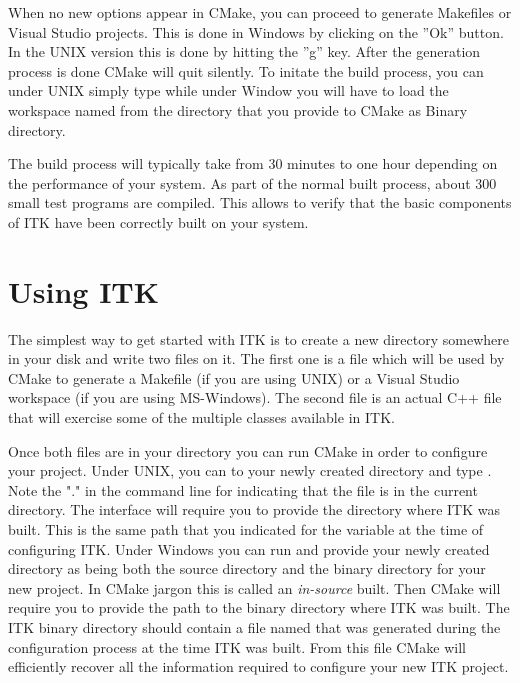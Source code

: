 When no new options appear in CMake, you can proceed to generate Makefiles or
Visual Studio projects. This is done in Windows by clicking on the ''Ok''
button.  In the UNIX version this is done by hitting the ''g'' key. After the
generation process is done CMake will quit silently. To initate the build
process, you can under UNIX simply type  while under Window you will
have to load the workspace named  from the directory that you
provide to CMake as Binary directory.

The build process will typically take from 30 minutes to one hour depending on
the performance of your system. As part of the normal built process, about 300
small test programs are compiled. This allows to verify that the basic
components of ITK have been correctly built on your system.


\section{Using ITK }
\label{sec:UsingITK}
 
The simplest way to get started with  ITK is to create a new directory
somewhere in your disk and write two files on it. The first one is a
 file which will be used by CMake to generate a Makefile
(if you are using UNIX) or a Visual Studio workspace (if you are using
MS-Windows).  The second file is an actual C++ file that will exercise some of
the multiple classes available in ITK.

Once both files are in your directory you can run CMake in order to configure
your project. Under UNIX, you can  to your newly created directory and
type . Note the "." in the command line for indicating that
the  file is in the current directory. The 
interface will require you to provide the directory where ITK was built. This
is the same path that you indicated for the  variable at
the time of configuring ITK. Under Windows you can run  and
provide your newly created directory as being both the source directory and the
binary directory for your new project. In CMake jargon this is called an
\emph{in-source} built. Then CMake will require you to provide the path to the
binary directory where ITK was built. The ITK binary directory should contain a
file named  that was generated during the configuration
process at the time ITK was built.  From this file CMake will efficiently
recover all the information required to configure your new ITK project.  


